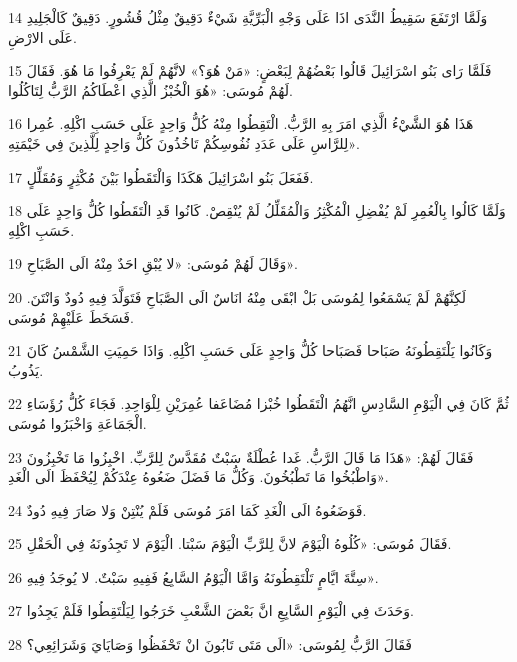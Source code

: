 \par 14 وَلَمَّا ارْتَفَعَ سَقِيطُ النَّدَى اذَا عَلَى وَجْهِ الْبَرِّيَّةِ شَيْءٌ دَقِيقٌ مِثْلُ قُشُورٍ. دَقِيقٌ كَالْجَلِيدِ عَلَى الارْضِ.
\par 15 فَلَمَّا رَاى بَنُو اسْرَائِيلَ قَالُوا بَعْضُهُمْ لِبَعْضٍ: «مَنْ هُوَ؟» لانَّهُمْ لَمْ يَعْرِفُوا مَا هُوَ. فَقَالَ لَهُمْ مُوسَى: «هُوَ الْخُبْزُ الَّذِي اعْطَاكُمُ الرَّبُّ لِتَاكُلُوا.
\par 16 هَذَا هُوَ الشَّيْءُ الَّذِي امَرَ بِهِ الرَّبُّ. الْتَقِطُوا مِنْهُ كُلُّ وَاحِدٍ عَلَى حَسَبِ اكْلِهِ. عُمِرا لِلرَّاسِ عَلَى عَدَدِ نُفُوسِكُمْ تَاخُذُونَ كُلُّ وَاحِدٍ لِلَّذِينَ فِي خَيْمَتِهِ».
\par 17 فَفَعَلَ بَنُو اسْرَائِيلَ هَكَذَا وَالْتَقَطُوا بَيْنَ مُكْثِرٍ وَمُقَلِّلٍ.
\par 18 وَلَمَّا كَالُوا بِالْعُمِرِ لَمْ يُفْضِلِ الْمُكْثِرُ وَالْمُقَلِّلُ لَمْ يُنْقِصْ. كَانُوا قَدِ الْتَقَطُوا كُلُّ وَاحِدٍ عَلَى حَسَبِ اكْلِهِ.
\par 19 وَقَالَ لَهُمْ مُوسَى: «لا يُبْقِ احَدٌ مِنْهُ الَى الصَّبَاحِ».
\par 20 لَكِنَّهُمْ لَمْ يَسْمَعُوا لِمُوسَى بَلْ ابْقَى مِنْهُ انَاسٌ الَى الصَّبَاحِ فَتَوَلَّدَ فِيهِ دُودٌ وَانْتَنَ. فَسَخَطَ عَلَيْهِمْ مُوسَى.
\par 21 وَكَانُوا يَلْتَقِطُونَهُ صَبَاحا فَصَبَاحا كُلُّ وَاحِدٍ عَلَى حَسَبِ اكْلِهِ. وَاذَا حَمِيَتِ الشَّمْسُ كَانَ يَذُوبُ.
\par 22 ثُمَّ كَانَ فِي الْيَوْمِ السَّادِسِ انَّهُمُ الْتَقَطُوا خُبْزا مُضَاعَفا عُمِرَيْنِ لِلْوَاحِدِ. فَجَاءَ كُلُّ رُؤَسَاءِ الْجَمَاعَةِ وَاخْبَرُوا مُوسَى.
\par 23 فَقَالَ لَهُمْ: «هَذَا مَا قَالَ الرَّبُّ. غَدا عُطْلَةٌ سَبْتٌ مُقَدَّسٌ لِلرَّبِّ. اخْبِزُوا مَا تَخْبِزُونَ وَاطْبُخُوا مَا تَطْبُخُونَ. وَكُلُّ مَا فَضَلَ ضَعُوهُ عِنْدَكُمْ لِيُحْفَظَ الَى الْغَدِ».
\par 24 فَوَضَعُوهُ الَى الْغَدِ كَمَا امَرَ مُوسَى فَلَمْ يُنْتِنْ وَلا صَارَ فِيهِ دُودٌ.
\par 25 فَقَالَ مُوسَى: «كُلُوهُ الْيَوْمَ لانَّ لِلرَّبِّ الْيَوْمَ سَبْتا. الْيَوْمَ لا تَجِدُونَهُ فِي الْحَقْلِ.
\par 26 سِتَّةَ ايَّامٍ تَلْتَقِطُونَهُ وَامَّا الْيَوْمُ السَّابِعُ فَفِيهِ سَبْتٌ. لا يُوجَدُ فِيهِ».
\par 27 وَحَدَثَ فِي الْيَوْمِ السَّابِعِ انَّ بَعْضَ الشَّعْبِ خَرَجُوا لِيَلْتَقِطُوا فَلَمْ يَجِدُوا.
\par 28 فَقَالَ الرَّبُّ لِمُوسَى: «الَى مَتَى تَابُونَ انْ تَحْفَظُوا وَصَايَايَ وَشَرَائِعِي؟
